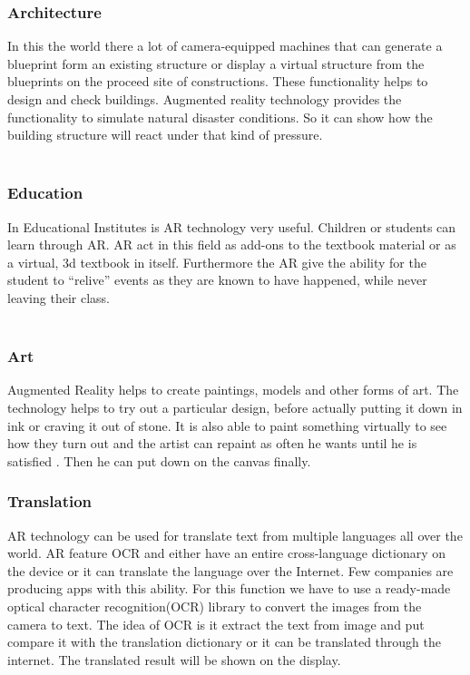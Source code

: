 \subsubsection{Architecture}
In this the world there a lot of camera-equipped machines that can generate a blueprint form an existing structure or display a virtual structure from the blueprints on the proceed site of constructions.  These functionality helps to design and check buildings. Augmented  reality technology provides the functionality to simulate natural disaster conditions. So it can show how the building structure will react under that kind of pressure.
\\
\\
\subsubsection{Education}
In Educational Institutes is AR technology very useful. Children or students can learn through AR. AR act in this field as  add-ons to the textbook material or as a virtual, 3d textbook in itself. Furthermore the AR give the ability for the student to “relive” events as they are known to have happened, while never leaving their class.
\\
\\
\subsubsection{Art}
Augmented Reality helps  to create paintings, models and other forms of art.  The technology helps  to try out a particular design, before  actually putting it down in ink or craving it out of stone. It is also able to paint something virtually to see how they turn out and the artist can repaint as often he wants until he is satisfied . Then he can put down on the canvas finally.
\\
\subsubsection{Translation}
AR technology can be used for translate text from multiple languages all over the world. AR feature OCR and either have an entire cross-language dictionary on the device or it can translate the language over the Internet.    Few companies are producing apps with this ability. For this function we have to use  a ready-made optical character recognition(OCR) library to convert the images from the camera to text. The idea of OCR is it extract the text from image and put compare it with the translation dictionary or it can be translated through the internet. The translated result will be shown on the display.
\\
